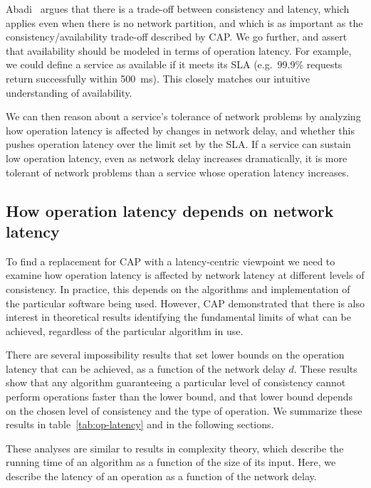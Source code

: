 \documentclass[a4paper,twocolumn,10pt]{article}
\begin{document}
Abadi~\cite{Abadi2012hb} argues that there is a trade-off between consistency and latency, which
applies even when there is no network partition, and which is as important as the
consistency/availability trade-off described by CAP. We go further, and assert that availability
should be modeled in terms of operation latency. For example, we could define a service as available
if it meets its SLA (e.g.\ 99.9\% requests return successfully within 500~ms). This closely matches
our intuitive understanding of availability.

We can then reason about a service's tolerance of network problems by analyzing how operation
latency is affected by changes in network delay, and whether this pushes operation latency over the
limit set by the SLA. If a service can sustain low operation latency, even as network delay
increases dramatically, it is more tolerant of network problems than a service whose operation
latency increases.

\subsection{How operation latency depends on network latency}\label{sec:network-dependence}

To find a replacement for CAP with a latency-centric viewpoint we need to examine how operation
latency is affected by network latency at different levels of consistency. In practice, this depends
on the algorithms and implementation of the particular software being used. However, CAP
demonstrated that there is also interest in theoretical results identifying the fundamental limits
of what can be achieved, regardless of the particular algorithm in use.

There are several impossibility results that set lower bounds on the operation latency that can be
achieved, as a function of the network delay $d$. These results show that any algorithm guaranteeing
a particular level of consistency cannot perform operations faster than the lower bound, and that
lower bound depends on the chosen level of consistency and the type of operation. We summarize these
results in table~\ref{tab:op-latency} and in the following sections.

These analyses are similar to results in complexity theory, which describe the running time of an
algorithm as a function of the size of its input. Here, we describe the latency of an operation as a
function of the network delay.
\end{document}
